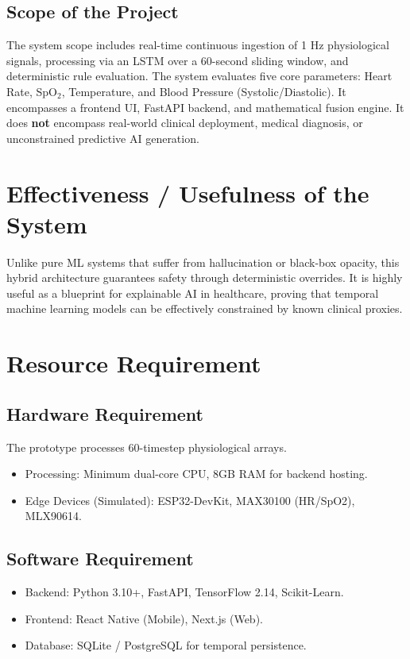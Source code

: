 \documentclass[12pt,a4paper]{report}
\begin{document}
\subsection{Scope of the Project}
The system scope includes real-time continuous ingestion of 1 Hz physiological signals, processing via an LSTM over a 60-second sliding window, and deterministic rule evaluation. The system evaluates five core parameters: Heart Rate, SpO$_2$, Temperature, and Blood Pressure (Systolic/Diastolic). It encompasses a frontend UI, FastAPI backend, and mathematical fusion engine. It does \textbf{not} encompass real-world clinical deployment, medical diagnosis, or unconstrained predictive AI generation.

\section{Effectiveness / Usefulness of the System}
Unlike pure ML systems that suffer from hallucination or black-box opacity, this hybrid architecture guarantees safety through deterministic overrides. It is highly useful as a blueprint for explainable AI in healthcare, proving that temporal machine learning models can be effectively constrained by known clinical proxies.

\section{Resource Requirement}
\subsection{Hardware Requirement}
The prototype processes 60-timestep physiological arrays.
\begin{itemize}
    \item Processing: Minimum dual-core CPU, 8GB RAM for backend hosting.
    \item Edge Devices (Simulated): ESP32-DevKit, MAX30100 (HR/SpO2), MLX90614.
\end{itemize}

\subsection{Software Requirement}
\begin{itemize}
    \item Backend: Python 3.10+, FastAPI, TensorFlow 2.14, Scikit-Learn.
    \item Frontend: React Native (Mobile), Next.js (Web).
    \item Database: SQLite / PostgreSQL for temporal persistence.
\end{itemize}
\end{document}
